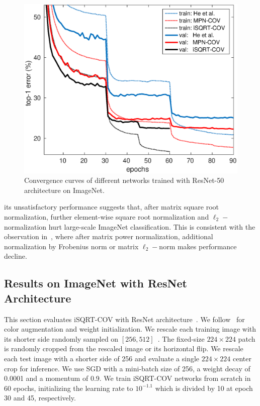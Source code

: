 \documentclass[10pt,twocolumn,letterpaper]{article}
\begin{document}
\begin{figure}[t]
	\setlength\tabcolsep{4pt}
	\footnotesize
	\centering
	\begin{minipage}[b]{0.7\linewidth}
		\centering
		\includegraphics[width=1.0\textwidth]{ResNet50-curve-top1.eps}
	\end{minipage}
	\caption{Convergence curves of different networks trained  with ResNet-50 architecture on ImageNet.}
	\label{figure:traing-iSQRT-COV}
\end{figure}
its unsatisfactory performance  suggests that,  after matrix square root normalization, further element-wise square root normalization and $\ell_{2}-$normalization hurt large-scale ImageNet classification. This is consistent with the observation in~\cite[Tab. 1]{Li_2017_ICCV}, where after matrix power normalization,  additional normalization by Frobenius norm or matrix $\ell_{2}-$norm makes performance decline. 


\subsection{Results  on ImageNet  with ResNet Architecture}\label{section:ImageNet-ResNet}

This section evaluates  iSQRT-COV with  ResNet architecture~\cite{He_2016_CVPR}. We  follow~\cite{Li_2017_ICCV} for color augmentation and weight initialization. We rescale each training image  with its shorter side randomly sampled on $[256, 512]$~\cite{Simonyan15}. The fixed-size $224\times224$ patch is randomly cropped from the rescaled image or its horizontal flip. We rescale each test image with a shorter side of 256 and evaluate a single $224\times 224$ center crop for inference. We use SGD with a mini-batch size of 256, a weight decay  of 0.0001 and a momentum of 0.9. We train  iSQRT-COV networks from scratch in 60 epochs, initializing    the learning rate  to $10^{-1.1}$ which is divided by 10 at epoch 30 and 45, respectively. 
\end{document}
